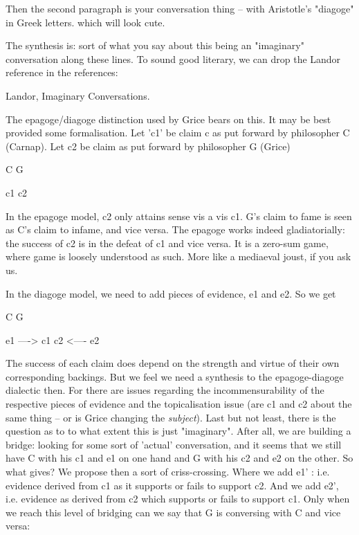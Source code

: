 \documentclass[10pt,titlepage]{book}
\begin{document}
{Then the second paragraph is your conversation thing -- with Aristotle's  
"diagoge" in Greek letters. which will look cute.
 
The synthesis is: sort of what you say about this being an "imaginary"  
conversation along these lines. To sound good literary, we can drop the Landor  
reference in the references:
 
   Landor, Imaginary Conversations.
 
 The epagoge/diagoge distinction used by Grice bears on this. It may be best 
 provided some formalisation. Let 'c1' be claim c as put forward by 
philosopher C  (Carnap). Let c2 be claim as put forward by philosopher G (Grice)
 
                  C                         G
 
                  c1                        c2
 
In the epagoge model, c2 only attains sense vis a vis c1. G's claim to fame 
 is seen as C's claim to infame, and vice versa. The epagoge works indeed  
gladiatorially: the success of c2 is in the defeat of c1 and vice versa. It 
is a  zero-sum game, where game is loosely understood as such. More like a 
mediaeval  joust, if you ask us.
 
In the diagoge model, we need to add pieces of evidence, e1 and e2. So we  
get
 
                   C                          G
 
  e1  ---->    c1                          c2  <---- e2
 
 The success of each claim does depend on the strength and virtue of  their 
own corresponding backings. But we feel we need a synthesis to the  
epagoge-diagoge dialectic then. For there are issues regarding the  
incommensurability of the respective pieces of evidence and the topicalisation  issue (are 
c1 and c2 about the same thing -- or is Grice changing the  {\it subject}). 
Last but not least, there is the question as to to what extent this  is just 
"imaginary". After all, we are building a bridge: looking for some sort  of 
'actual' conversation, and it seems that we still have C with his c1 and e1  
on one hand and G with his c2 and e2 on the other. So what gives? We propose  
then a sort of criss-crossing. Where we add e1' : i.e. evidence derived  
from c1 as it supports or fails to support c2. And we add e2', i.e.  evidence 
as derived from c2 which supports or fails to support c1.  Only when we 
reach this level of bridging can we say that G is  conversing with C and vice 
versa:
 
}
\end{document}
